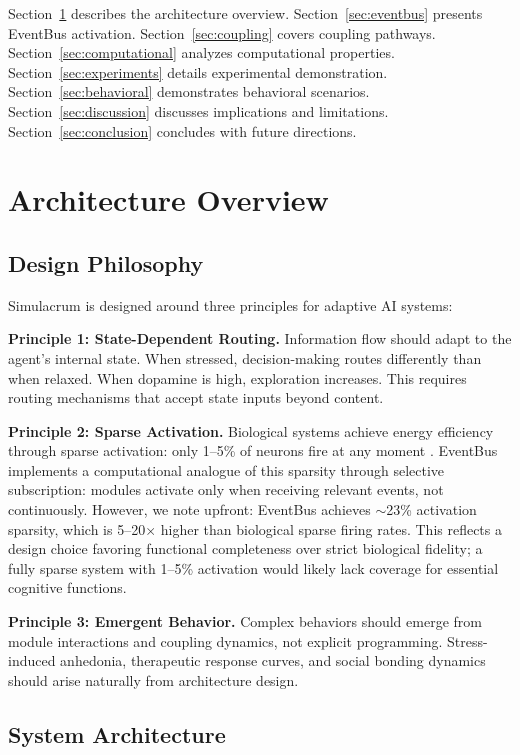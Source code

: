 \documentclass[preprint,12pt]{elsarticle}
\begin{document}
Section~\ref{sec:architecture} describes the architecture overview. Section~\ref{sec:eventbus} presents EventBus activation. Section~\ref{sec:coupling} covers coupling pathways. Section~\ref{sec:computational} analyzes computational properties. Section~\ref{sec:experiments} details experimental demonstration. Section~\ref{sec:behavioral} demonstrates behavioral scenarios. Section~\ref{sec:discussion} discusses implications and limitations. Section~\ref{sec:conclusion} concludes with future directions.

\section{Architecture Overview}
\label{sec:architecture}

\subsection{Design Philosophy}

Simulacrum is designed around three principles for adaptive AI systems:

\textbf{Principle 1: State-Dependent Routing.}
Information flow should adapt to the agent's internal state. When stressed, decision-making routes differently than when relaxed. When dopamine is high, exploration increases. This requires routing mechanisms that accept state inputs beyond content.

\textbf{Principle 2: Sparse Activation.}
Biological systems achieve energy efficiency through sparse activation: only 1--5\% of neurons fire at any moment \cite{lennie2003}. EventBus implements a computational analogue of this sparsity through selective subscription: modules activate only when receiving relevant events, not continuously. However, we note upfront: EventBus achieves $\sim$23\% activation sparsity, which is 5--20$\times$ higher than biological sparse firing rates. This reflects a design choice favoring functional completeness over strict biological fidelity; a fully sparse system with 1--5\% activation would likely lack coverage for essential cognitive functions.

\textbf{Principle 3: Emergent Behavior.}
Complex behaviors should emerge from module interactions and coupling dynamics, not explicit programming. Stress-induced anhedonia, therapeutic response curves, and social bonding dynamics should arise naturally from architecture design.

\subsection{System Architecture}
\end{document}
